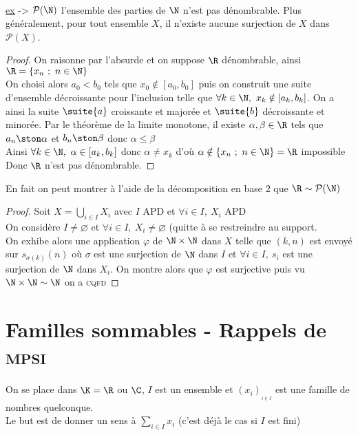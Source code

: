 		\vspace*{0.3cm} \\ \uline{ex} -> $\mathcal{P}(\N)$ l'ensemble des parties de $\N$ n'est pas dénombrable. Plus généralement, pour tout ensemble $X$, 
		il n'existe aucune surjection de $X$ dans $\mathcal{P}(X)$.
		\vspace*{0.5cm} \\ 
		\begin{proof}
		On raisonne par l'absurde et on suppose $\R$ dénombrable, ainsi $\R = \{x_n ~;~n\in \N\}$\\
		On choisi alors $a_0<b_0$ tels que $x_0\notin [a_0,b_0]$ puis on construit une suite d'ensemble décroissante pour l'inclusion telle que $\forall k\in\N, ~x_k \notin [a_k,b_k]$. On a ainsi la suite $\suite{a}$ croissante et majorée et $\suite{b}$ décroissante et minorée. Par le théorème de la limite monotone, il existe $\alpha,\beta \in\R$ tels que $a_n \ston \alpha$ et $b_n\ston \beta$ donc $\alpha \leqslant \beta$\\
		Ainsi $\forall k\in\N ,~ \alpha \in [a_k,b_k]$ donc $\alpha \neq x_k$ d'où $\alpha \notin\{x_n ~;~n\in \N\} = \R$ impossible\\
		Donc $\R$ n'est pas dénombrable.
		\end{proof}
		En fait on peut montrer à l'aide de la décomposition en base $2$ que $\R \sim \mathcal{P}(\N)$
		\vspace*{0.5cm} \\ 
		\begin{proof}
		Soit $X=\bigcup\limits_{i\in I} X_i$ avec $I$ APD et $\forall i\in I ,~X_i$ APD\\
		On considère $I\neq \varnothing$ et $\forall i\in I,~X_i\neq \varnothing$ (quitte à se restreindre au support.\\
		On exhibe alors une application $\varphi$ de $\N\times \N$ dans $X$ telle que $(k,n)$ est envoyé sur $s_{\sigma(k)}(n)$ où $\sigma$ est une surjection de $\N$ 
		dans $I$ et $\forall i\in I,~s_i$ est une surjection de $\N$ dans $X_i$. On montre alors que $\varphi$ est surjective puis vu $\N\times\N \sim \N$ on a 
		\textsc{cqfd}
		\end{proof}
	\section{Familles sommables - Rappels de \textsc{mpsi}}
		On se place dans $\K=\R$ ou $\C$, $I$ est un ensemble et $(x_i)_{_{i\in I}}$ est une famille de nombres quelconque.\\
		Le but est de donner un sens à $\sum\limits_{i\in I} x_i$ (c'est déjà le cas si $I$ est fini)
